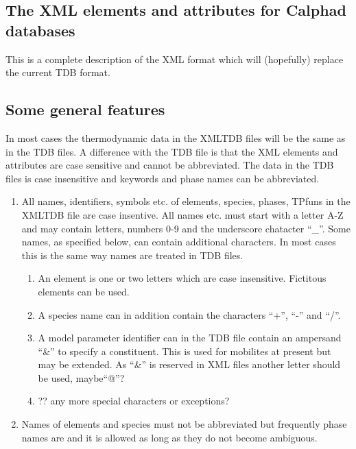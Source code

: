 \documentclass[12pt]{article}
\begin{document}
\begin{appendices}
\setcounter{equation}{0}
\renewcommand{\theequation}{A\arabic{equation}}
\setcounter{figure}{0}
\renewcommand{\thefigure}{A\arabic{figure}}
\section{The XML elements and attributes for Calphad databases}\label{sc:xmltdb}

This is a complete description of the XML format which will
(hopefully) replace the current TDB format.

\subsection{Some general features}

In most cases the thermodynamic data in the XMLTDB files will be the
same as in the TDB files.  A difference with the TDB file is that the
XML elements and attributes are case sensitive and cannot be
abbreviated.  The data in the TDB files is case insensitive and
keywords and phase names can be abbreviated.


\begin{enumerate}
\item All names, identifiers, symbols etc. of elements, species,
  phases, TPfuns in the XMLTDB file are case insentive.  All names
  etc.  must start with a letter A-Z and may contain letters, numbers
  0-9 and the underscore chatacter ``\_''.  Some names, as specified
  below, can contain additional characters.  In most cases this is the
  same way names are treated in TDB files.

  \begin{enumerate}
  \item An element is one or two letters which are case insensitive.
    Fictitous elements can be used.
  \item A species name can in addition contain the characters ``+'',
    ``-'' and ``/''.
  \item A model parameter identifier can in the TDB file contain an
    ampersand ``\&'' to specify a constituent.  This is used for
    mobilites at present but may be extended.  As ``\&'' is reserved
    in XML files another letter should be used, maybe``@''?
  \item ?? any more special characters or exceptions?
  \end{enumerate}

\item Names of elements and species must not be abbreviated but frequently
  phase names are and it is allowed as long as they do not become
  ambiguous.  


\end{enumerate}
\end{appendices}
\end{document}
